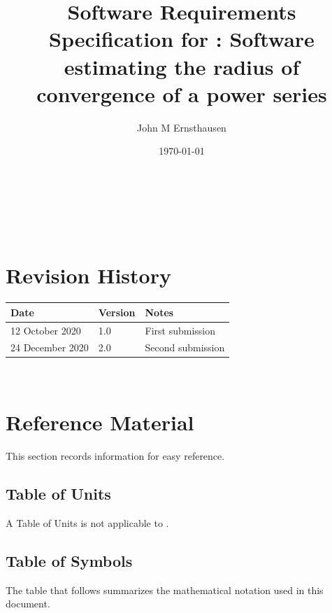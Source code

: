 \documentclass[12pt]{article}
\begin{document}
\title{Software Requirements Specification for : Software estimating the radius of convergence of
a power series} 
\author{John M Ernsthausen}
\date{\today}
	
\maketitle

~\newpage


\tableofcontents

~\newpage

\section*{Revision History}

\begin{tabularx}{\textwidth}{p{4cm}p{2cm}X}
\toprule {\bf Date} & {\bf Version} & {\bf Notes}\\
\midrule
12 October 2020 & 1.0 & First submission\\
24 December 2020 & 2.0 & Second submission\\
\bottomrule
\end{tabularx}

~\newpage

\section{Reference Material}

This section records information for easy reference.

\subsection{Table of Units}

A Table of Units is not applicable to .

\subsection{Table of Symbols}

The table that follows summarizes the mathematical notation used in this document.
\end{document}
